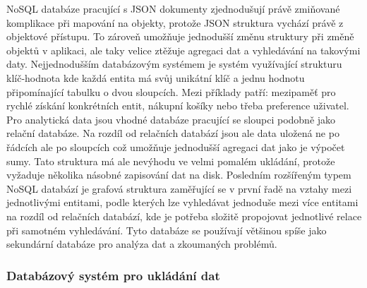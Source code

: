	\Ac{NoSQL} databáze pracující s \Ac{JSON} dokumenty zjednodušují právě zmiňované komplikace při mapování
	na objekty, protože \Ac{JSON} struktura vychází právě z objektové přístupu.
	To zároveň umožňuje jednodušší změnu struktury při změně objektů v aplikaci, ale taky velice ztěžuje agregaci dat
	a vyhledávání na takovými daty.
	Nejjednodušším databázovým systémem je systém využívající strukturu klíč-hodnota kde každá entita má svůj unikátní klíč
	a jednu hodnotu připomínající tabulku o dvou sloupcích.
	Mezi příklady patří: mezipaměť pro rychlé získání konkrétních entit, nákupní košíky nebo třeba preference uživatel.
	Pro analytická data jsou vhodné databáze pracující se sloupci podobně jako relační databáze.
	Na rozdíl od relačních databází jsou ale data uložená ne po řádcích ale po sloupcích což umožňuje jednodušší agregaci
	dat jako je výpočet sumy.
	Tato struktura má ale nevýhodu ve velmi pomalém ukládání, protože vyžaduje několika násobné zapisování dat na disk.
	Posledním rozšířeným typem \Ac{NoSQL} databází je grafová struktura zaměřující se v první řadě na vztahy mezi
	jednotlivými entitami, podle kterých lze vyhledávat jednoduše mezi více entitami na rozdíl od relačních databází, kde
	je potřeba složitě propojovat jednotlivé relace při samotném vyhledávání.
	Tyto databáze se používají většinou spíše jako sekundární databáze pro analýza dat a zkoumaných problémů.
	\cite{types-of-nosql-databases}

		\subsubsection{Databázový systém pro ukládání dat}

